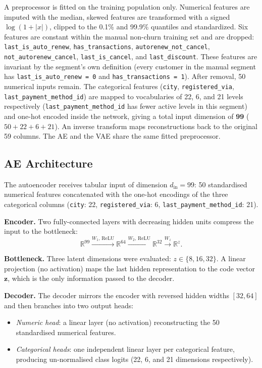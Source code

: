 \documentclass{article}
\begin{document}
A preprocessor is fitted on the training population only. Numerical features are
imputed with the median, skewed features are transformed with a signed
$\log(1+|x|)$, clipped to the 0.1\% and 99.9\% quantiles and standardized.
Six features are constant within the manual non-churn training set and are dropped:
\texttt{last\_is\_auto\_renew}, \texttt{has\_transactions},
\texttt{autorenew\_not\_cancel}, \texttt{not\_autorenew\_cancel},
\texttt{last\_is\_cancel}, and \texttt{last\_discount}. These features are
invariant by the segment's own definition (every customer in the manual segment
has \texttt{last\_is\_auto\_renew\,=\,0} and \texttt{has\_transactions\,=\,1}).
After removal, 50 numerical inputs remain. The categorical features
(\texttt{city}, \texttt{registered\_via}, \texttt{last\_payment\_method\_id})
are mapped to vocabularies of 22, 6, and 21 levels respectively
(\texttt{last\_payment\_method\_id} has fewer active levels in this segment)
and one-hot encoded inside the network, giving a total input dimension of
$\mathbf{99}$ ($50 + 22 + 6 + 21$). An inverse transform maps
reconstructions back to the original 59 columns. The AE and the VAE share the
same fitted preprocessor.

\subsection{AE Architecture}

The autoencoder receives tabular input of dimension $d_\text{in} = 99$: 50 standardised
numerical features concatenated with the one-hot encodings of the three categorical columns
(\texttt{city}: 22, \texttt{registered\_via}: 6, \texttt{last\_payment\_method\_id}: 21).

\textbf{Encoder.} Two fully-connected layers with decreasing hidden units compress the input
to the bottleneck:
\[
\mathbb{R}^{99} \xrightarrow{W_1,\,\text{ReLU}} \mathbb{R}^{64}
                \xrightarrow{W_2,\,\text{ReLU}} \mathbb{R}^{32}
                \xrightarrow{W_z}                \mathbb{R}^{z}.
\]

\textbf{Bottleneck.} Three latent dimensions were evaluated: $z \in \{8, 16, 32\}$.
A linear projection (no activation) maps the last hidden representation to the code vector
$\mathbf{z}$, which is the only information passed to the decoder.

\textbf{Decoder.} The decoder mirrors the encoder with reversed hidden widths $[32, 64]$
and then branches into two output heads:
\begin{itemize}
    \item \textit{Numeric head}: a linear layer (no activation) reconstructing the 50
          standardised numerical features.
    \item \textit{Categorical heads}: one independent linear layer per categorical feature,
          producing un-normalised class logits (22, 6, and 21 dimensions respectively).
\end{itemize}
\end{document}
